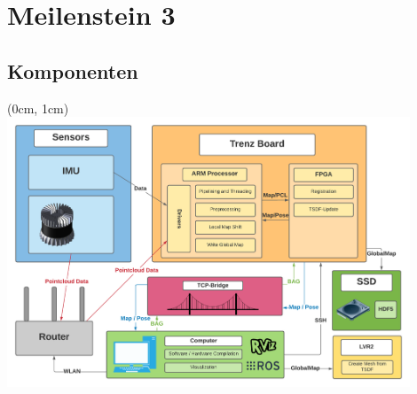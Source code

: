 \documentclass{beamer}
\begin{document}
\section{Meilenstein 3}
\begin{frame}
\centering
\color{dark}\LARGE\textbf{\secname}
\end{frame}

\subsection{Komponenten}
\begin{frame}{\subsecname}
\begin{textblock*}{12.8cm}(0cm, 1cm)
\centering
\includegraphics[width=12cm]{images/Architecture.pdf}
\end{textblock*}
\end{frame}
\end{document}
